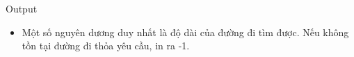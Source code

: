 Output  
\begin{itemize}
	\item     Một số nguyên dương duy nhất là độ dài của đường đi tìm được. Nếu không tồn tại đường đi thỏa yêu cầu, in ra -1.   
\end{itemize}